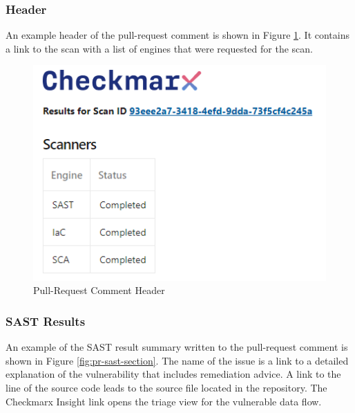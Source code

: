 \subsubsection{Header}

An example header of the pull-request comment is shown in Figure
\ref{fig:pr-header-section}.  It contains a link to the scan with a list of engines
that were requested for the scan.


\begin{figure}[h]
    \includegraphics[width=\textwidth]{graphics/pr-header.png}
    \caption{Pull-Request Comment Header}
    \label{fig:pr-header-section}
\end{figure}


\subsubsection{SAST Results}

An example of the SAST result summary written to the pull-request comment
is shown in Figure
\ref{fig:pr-sast-section}.  The name of the issue is a link to a detailed
explanation of the vulnerability that includes remediation advice.  A
link to the line of the source code leads to the source file located in the
repository.  The Checkmarx Insight link opens the triage view for the vulnerable
data flow.

